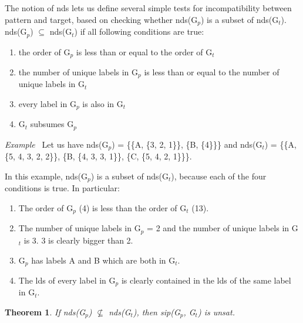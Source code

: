 \documentclass{l4proj}
\newcounter{example}[section]
\newenvironment{example}[1][]{\refstepcounter{example}\par\medskip
   \noindent \textit{Example~\theexample #1} \rmfamily}{\medskip}
\newtheorem{theorem}{Theorem}[section]
\begin{document}
The notion of \gls{nds} lets us define several simple tests for incompatibility between \gls{pattern} and \gls{target}, based on checking whether \gls{nds}(G$_{p}$) is a subset of \gls{nds}(G$_{t}$). \gls{nds}(G$_{p}$) $\subseteq$ \gls{nds}(G$_{t}$) if all following conditions are true:
\begin{enumerate}
\item the order of G$_{p}$ is less than or equal to the order of G$_{t}$
\item the number of unique labels in G$_{p}$ is less than or equal to the number of unique labels in G$_{t}$
\item every label in G$_{p}$ is also in G$_{t}$
\item G$_{t}$ subsumes G$_{p}$
\end{enumerate}

\begin{example}
Let us have \gls{nds}(G$_{p}$) = \{\{A, \{3, 2, 1\}\}, \{B, \{4\}\}\} and
\gls{nds}(G$_{t}$) = \{\{A, \{5, 4, 3, 2, 2\}\}, \{B, \{4, 3, 3, 1\}\}, \{C, \{5, 4, 2, 1\}\}\}.

In this example, \gls{nds}(G$_{p}$) is a subset of \gls{nds}(G$_{t}$), because each of the four conditions is true. In particular:
\begin{enumerate}
\item The order of G$_{p}$ (4) is less than the order of G$_{t}$ (13).
\item The number of unique labels in G$_{p}$ = 2 and the number of unique labels in G$_{t}$ is 3. 3 is clearly bigger than 2.
\item G$_{p}$ has labels A and B which are both in G$_{t}$.
\item The \gls{lds} of every label in G$_{p}$ is clearly contained in the \gls{lds} of the same label in G$_{t}$.
\end{enumerate}
\end{example} 

\begin{theorem}
\label{th:nds}
If \gls{nds}(G$_{p}$) $\nsubseteq$ \gls{nds}(G$_{t}$), then \gls{sip}(G$_{p}$, G$_{t}$) is \gls{unsat}.
\end{theorem}
\end{document}
